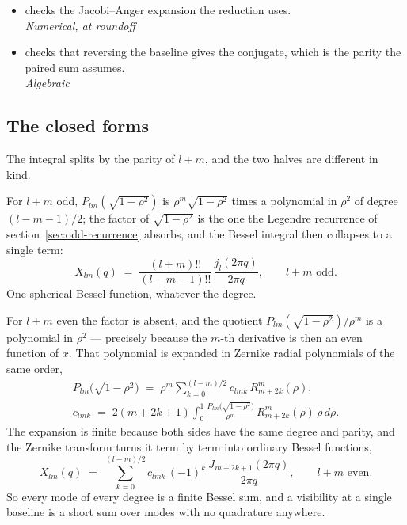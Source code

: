 \begin{itemize}
  \item[$\checkmark$]  checks the Jacobi--Anger expansion the reduction
    uses.
    \\[1pt] \quad \emph{Numerical, at roundoff}
  \item[$\checkmark$]  checks that reversing the baseline gives the
    conjugate, which is the parity the paired sum assumes.
    \\[1pt] \quad \emph{Algebraic}
\end{itemize}

\subsection{The closed forms}

The integral splits by the parity of $l+m$, and the two halves are different in kind.

For $l+m$ odd, $P_{lm}(\sqrt{1-\rho^2})$ is $\rho^m\sqrt{1-\rho^2}$ times a polynomial in
$\rho^2$ of degree $(l-m-1)/2$; the factor of $\sqrt{1-\rho^2}$ is the one the Legendre
recurrence of section~\ref{sec:odd-recurrence} absorbs, and the Bessel integral then collapses
to a single term:
\begin{equation}
  X_{lm}(q) \;=\; \frac{(l+m)!!}{(l-m-1)!!}\,
  \frac{j_l(2\pi q)}{2\pi q} , \qquad l+m \text{ odd} .
  \label{eq:brief-odd}
\end{equation}
One spherical Bessel function, whatever the degree.

For $l+m$ even the factor is absent, and the quotient $P_{lm}(\sqrt{1-\rho^2})/\rho^m$ is a
polynomial in $\rho^2$ --- precisely because the $m$-th derivative is then an even function of
$x$.  That polynomial is expanded in Zernike radial polynomials of the same order,
\begin{equation}
  \begin{gathered}
    P_{lm}\bigl(\sqrt{1-\rho^2}\bigr) \;=\; \rho^m \sum_{k=0}^{(l-m)/2} c_{lmk}\,
    R_{m+2k}^{m}(\rho) , \\
    c_{lmk} \;=\; 2(m+2k+1)\int_0^1 \frac{P_{lm}\bigl(\sqrt{1-\rho^2}\bigr)}{\rho^m}\,
    R_{m+2k}^{m}(\rho)\,\rho\, d\rho .
  \end{gathered}
  \label{eq:brief-even-coefficients}
\end{equation}
The expansion is finite because both sides have the same degree and parity, and the Zernike
transform turns it term by term into ordinary Bessel functions,
\begin{equation}
  X_{lm}(q) \;=\; \sum_{k=0}^{(l-m)/2} c_{lmk}\,(-1)^k\,
  \frac{J_{m+2k+1}(2\pi q)}{2\pi q} , \qquad l+m \text{ even} .
  \label{eq:brief-even}
\end{equation}
So every mode of every degree is a finite Bessel sum, and a visibility at a single baseline
is a short sum over modes with no quadrature anywhere.

